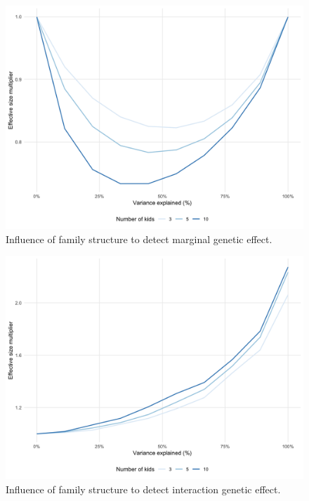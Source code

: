 \documentclass[]{book}
\begin{document}
\begin{figure}

{\centering \includegraphics[width=1\linewidth]{figures/05-figure-sup-power-marginal-kids} 

}

\caption{Influence of family structure to detect
marginal genetic effect.}\label{fig:power-marginal-kids}
\end{figure}




\begin{figure}

{\centering \includegraphics[width=1\linewidth]{figures/06-figure-sup-power-interaction-kids} 

}

\caption{Influence of family structure to detect
interaction genetic effect.}\label{fig:power-interaction-kids}
\end{figure}
\end{document}

